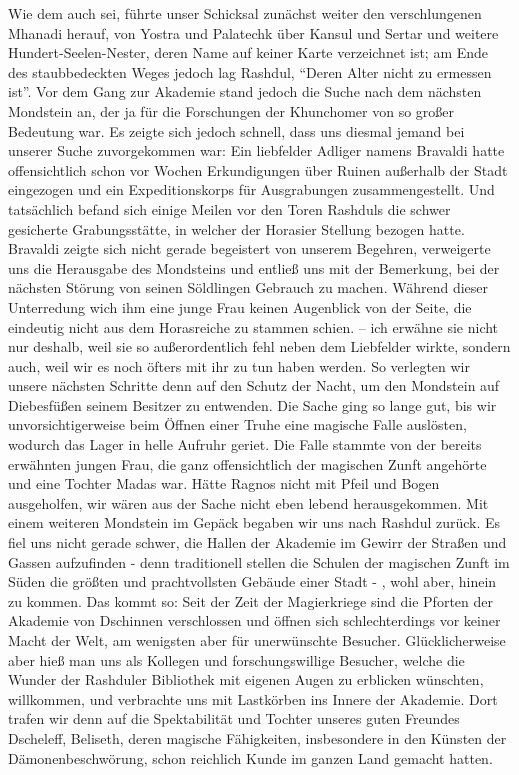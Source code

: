 Wie dem auch sei, führte unser Schicksal zunächst weiter den verschlungenen Mhanadi herauf, von Yostra und Palatechk über Kansul und Sertar und weitere Hundert-Seelen-Nester, deren Name auf keiner Karte verzeichnet ist; am Ende des staubbedeckten Weges jedoch lag Rashdul, ``Deren Alter nicht zu ermessen ist''. Vor dem Gang zur Akademie stand jedoch die Suche nach dem nächsten Mondstein an, der ja für die Forschungen der Khunchomer von so großer Bedeutung war. Es zeigte sich jedoch schnell, dass uns diesmal jemand bei unserer Suche zuvorgekommen war: Ein liebfelder Adliger namens Bravaldi hatte offensichtlich schon vor Wochen Erkundigungen über Ruinen außerhalb der Stadt eingezogen und ein Expeditionskorps für Ausgrabungen zusammengestellt. Und tatsächlich befand sich einige Meilen vor den Toren Rashduls die schwer gesicherte Grabungsstätte, in welcher der Horasier Stellung bezogen hatte. Bravaldi zeigte sich nicht gerade begeistert von unserem Begehren, verweigerte uns die Herausgabe des Mondsteins und entließ uns mit der Bemerkung, bei der nächsten Störung von seinen Söldlingen Gebrauch zu machen. Während dieser Unterredung wich ihm eine junge Frau keinen Augenblick von der Seite, die eindeutig nicht aus dem Horasreiche zu stammen schien. -- ich erwähne sie nicht nur deshalb, weil sie so außerordentlich fehl neben dem Liebfelder wirkte, sondern auch, weil wir es noch öfters mit ihr zu tun haben werden. So verlegten wir unsere nächsten Schritte denn auf den Schutz der Nacht, um den Mondstein auf Diebesfüßen seinem Besitzer zu entwenden. Die Sache ging so lange gut, bis wir unvorsichtigerweise beim Öffnen einer Truhe eine magische Falle auslösten, wodurch das Lager in helle Aufruhr geriet. Die Falle stammte von der bereits erwähnten jungen Frau, die ganz offensichtlich der magischen Zunft angehörte und eine Tochter Madas war. Hätte Ragnos nicht mit Pfeil und Bogen ausgeholfen, wir wären aus der Sache nicht eben lebend herausgekommen. Mit einem weiteren Mondstein im Gepäck begaben wir uns nach Rashdul zurück. Es fiel uns nicht gerade schwer, die Hallen der Akademie im Gewirr der Straßen und Gassen aufzufinden - denn traditionell stellen die Schulen der magischen Zunft im Süden die größten und prachtvollsten Gebäude einer Stadt - , wohl aber, hinein zu kommen. Das kommt so: Seit der Zeit der Magierkriege sind die Pforten der Akademie von Dschinnen verschlossen und öffnen sich schlechterdings vor keiner Macht der Welt, am wenigsten aber für unerwünschte Besucher. Glücklicherweise aber hieß man uns als Kollegen und forschungswillige Besucher, welche die Wunder der Rashduler Bibliothek mit eigenen Augen zu erblicken wünschten, willkommen, und verbrachte uns mit Lastkörben ins Innere der Akademie. Dort trafen wir denn auf die Spektabilität und Tochter unseres guten Freundes Dscheleff, Beliseth, deren magische Fähigkeiten, insbesondere in den Künsten der Dämonenbeschwörung, schon reichlich Kunde im ganzen Land gemacht hatten.

